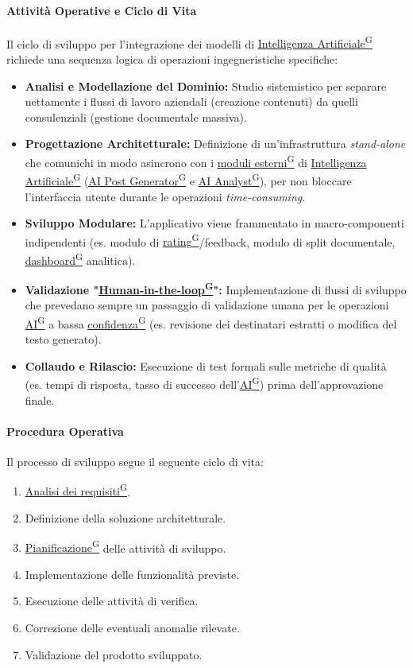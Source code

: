 \documentclass[a4paper,12pt]{article}
\providecommand{\glslink}[2]{\href{https://alittlebyte-19.github.io/Documentazione/glossario.html\#gls-#1}{\underline{#2}\textsuperscript{\scriptsize G}}}
\begin{document}
\paragraph{Attività Operative e Ciclo di Vita}
Il ciclo di sviluppo per l'integrazione dei modelli di \glslink{intelligenza-artificiale-ai}{Intelligenza Artificiale} richiede una sequenza logica di operazioni ingegneristiche specifiche:
\begin{itemize}
    \item \textbf{Analisi e Modellazione del Dominio:} Studio sistemistico per separare nettamente i flussi di lavoro aziendali (creazione contenuti) da quelli consulenziali (gestione documentale massiva).
    \item \textbf{Progettazione Architetturale:} Definizione di un'infrastruttura \textit{stand-alone} che comunichi in modo asincrono con i \glslink{moduli-esterni}{moduli esterni} di \glslink{intelligenza-artificiale-ai}{Intelligenza Artificiale} (\glslink{ai-post-generator}{AI Post Generator} e \glslink{ai-analyst}{AI Analyst}), per non bloccare l'interfaccia utente durante le operazioni \textit{time-consuming}.
    \item \textbf{Sviluppo Modulare:} L'applicativo viene frammentato in macro-componenti indipendenti (es. modulo di \glslink{rating}{rating}/feedback, modulo di split documentale, \glslink{dashboard}{dashboard} analitica).
    \item \textbf{Validazione "\glslink{human-in-the-loop}{Human-in-the-loop}":} Implementazione di flussi di sviluppo che prevedano sempre un passaggio di validazione umana per le operazioni \glslink{intelligenza-artificiale-ai}{AI} a bassa \glslink{confidenza-confidence-score}{confidenza} (es. revisione dei destinatari estratti o modifica del testo generato).
    \item \textbf{Collaudo e Rilascio:} Esecuzione di test formali sulle metriche di qualità (es. tempi di risposta, tasso di successo dell'\glslink{intelligenza-artificiale-ai}{AI}) prima dell'approvazione finale.
\end{itemize}

\paragraph{Procedura Operativa}
Il processo di sviluppo segue il seguente ciclo di vita:

\begin{enumerate}
    \item \glslink{analisi-dei-requisiti-adr}{Analisi dei requisiti}.
    \item Definizione della soluzione architetturale.
    \item \glslink{pianificazione}{Pianificazione} delle attività di sviluppo.
    \item Implementazione delle funzionalità previste.
    \item Esecuzione delle attività di verifica.
    \item Correzione delle eventuali anomalie rilevate.
    \item Validazione del prodotto sviluppato.
\end{enumerate}
\end{document}
